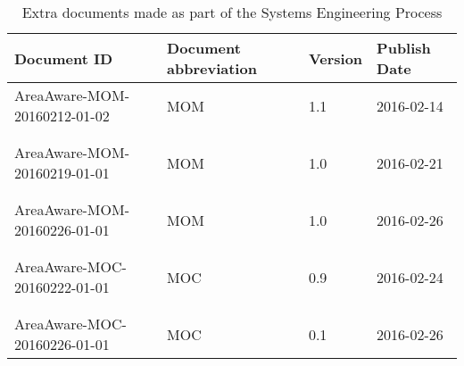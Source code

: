 \begin{table}[h]
    \centering
    \begin{tabular}{llll}
    \textbf{Document ID} & \textbf{Document abbreviation} & \textbf{Version} & \textbf{Publish Date} \\ \hline
    AreaAware-MOM-20160212-01-02 & MOM & 1.1 & 2016-02-14 \\ \hline
    &  &  &  \\
    &  &  &  \\
    AreaAware-MOM-20160219-01-01 & MOM & 1.0 & 2016-02-21 \\ \hline
    &  &  &  \\
    &  &  &  \\
    AreaAware-MOM-20160226-01-01 & MOM & 1.0 & 2016-02-26 \\ \hline
    &  &  &  \\
    &  &  &  \\
    AreaAware-MOC-20160222-01-01 & MOC & 0.9 & 2016-02-24\\ \hline
    &  &  &  \\
    &  &  &  \\
    AreaAware-MOC-20160226-01-01 & MOC & 0.1 & 2016-02-26 \\ \hline
    \end{tabular}
    \caption{Extra documents made as part of the Systems Engineering Process}
    \label{tab:extra}
\end{table}

